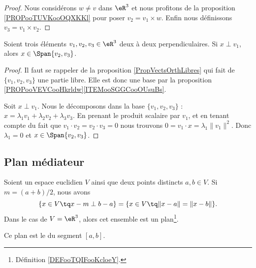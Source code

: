 \begin{proof}
	Nous considérons \( w\neq v\) dans \( \eR^3\) et nous profitons de la proposition \ref{PROPooTUVKooOQXKKl} pour poser \( v_2=v_1\times w\). Enfin nous définissons \( v_3=v_1\times v_2\).
\end{proof}

\begin{lemma}       \label{LEMooGXGCooDfgbqG}
	Soient trois éléments \( v_1,v_2,v_3\in \eR^3\) deux à deux perpendiculaires. Si \( x\perp v_1\), alors \( x\in \Span\{ v_2,v_3 \}\).
\end{lemma}

\begin{proof}
	Il faut se rappeler de la proposition \ref{PropVectsOrthLibres} qui fait de \( \{ v_1,v_2,v_3 \}\) une partie libre. Elle est donc une base par la proposition \ref{PROPooVEVCooHkrldw}\ref{ITEMooSGGCooOUsuBs}.

	Soit \( x\perp v_1\). Nous le décomposons dans la base \( \{ v_1,v_2,v_3 \}\) : \( x=\lambda_1 v_1+\lambda_2 v_2+\lambda_3v_3\). En prenant le produit scalaire par \( v_1\), et en tenant compte du fait que \( v_1\cdot v_2=v_2\cdot v_3=0\) nous trouvons \( 0=v_1\cdot x=\lambda_1\| v_1 \|^2\). Donc \( \lambda_1=0\) et \( x\in \Span\{ v_2,v_3 \}\).
\end{proof}

\subsection{Plan médiateur}

\begin{proposition}        \label{PROPooSNUDooTxovMz}
    Soient un espace euclidien \( V\) ainsi que deux points distincts \( a,b\in V\). Si \( m=(a+b)/2\), nous avons
	\begin{equation}
		\{ x\in V\tq x-m\perp b-a \}=\{ x\in V\tq \| x-a \|=\| x-b \| \}.
	\end{equation}
	Dans le cas de \( V=\eR^3\), alors cet ensemble est un plan\footnote{Définition \ref{DEFooTQIFooKcloeY}.}.

	Ce plan est le  du segment \( [a,b]\).
\end{proposition}

